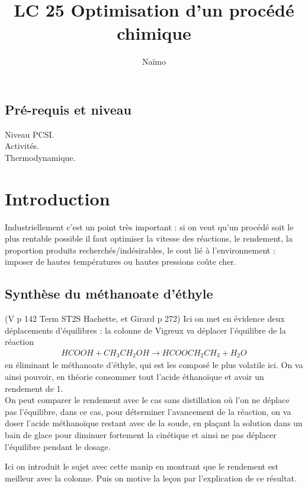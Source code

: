 \documentclass[12pt,prb,aps,epsf]{report}
\begin{document}
	
	\title{LC 25 Optimisation d'un procédé chimique}
	\author{Naïmo}
	
	\maketitle
	
	\tableofcontents
	
	\pagebreak

\subsection{Pré-requis et niveau}
Niveau PCSI.\\
Activités.\\
Thermodynamique.

\section{Introduction}
Industriellement c'est un point très important : si on veut qu'un procédé soit le plus rentable possible il faut optimiser la vitesse des réactions, le rendement, la proportion produits recherchés/indésirables, le cout lié à l'environnement : imposer de hautes températures ou hautes pressions coûte cher.

\subsection{Synthèse du méthanoate d'éthyle}
(V p 142 Term ST2S Hachette, et Girard p 272) Ici on met en évidence deux déplacements d'équilibres :
la colonne de Vigreux va déplacer l'équilibre de la réaction 
\begin{eqnarray}
HCOOH + CH_3CH_2OH \longrightarrow HCOOCH_2CH_3 + H_2O
\end{eqnarray} 
en éliminant le méthanoate d'éthyle, qui est les composé le plus volatile ici. On va ainsi pouvoir, en théorie consommer tout l'acide éthanoïque et avoir un rendement de 1.\\

On peut comparer le rendement avec le cas sans distillation où l'on ne déplace pas l'équilibre, dans ce cas, pour déterminer l'avancement de la réaction, on va doser l'acide méthanoïque restant avec de la soude, en plaçant la solution dans un bain de glace pour diminuer fortement la cinétique et ainsi ne pas déplacer l'équilibre pendant le dosage.

Ici on introduit le sujet avec cette manip en montrant que le rendement est meilleur avec la colonne. Puis on motive la leçon par l'explication de ce résultat.
\end{document}
